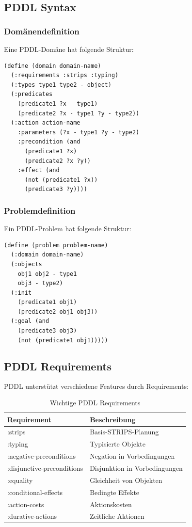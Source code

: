 ﻿\documentclass[a4paper,12pt]{article}
\theoremstyle{definition}
\begin{document}
\subsection{PDDL Syntax}

\subsubsection{Domänendefinition}

Eine PDDL-Domäne hat folgende Struktur:

\begin{lstlisting}[language=PDDL, caption=PDDL Domänen-Template]
(define (domain domain-name)
  (:requirements :strips :typing)
  (:types type1 type2 - object)
  (:predicates 
    (predicate1 ?x - type1)
    (predicate2 ?x - type1 ?y - type2))
  (:action action-name
    :parameters (?x - type1 ?y - type2)
    :precondition (and
      (predicate1 ?x)
      (predicate2 ?x ?y))
    :effect (and
      (not (predicate1 ?x))
      (predicate3 ?y))))
\end{lstlisting}

\subsubsection{Problemdefinition}

Ein PDDL-Problem hat folgende Struktur:

\begin{lstlisting}[language=PDDL, caption=PDDL Problem-Template]
(define (problem problem-name)
  (:domain domain-name)
  (:objects
    obj1 obj2 - type1
    obj3 - type2)
  (:init
    (predicate1 obj1)
    (predicate2 obj1 obj3))
  (:goal (and
    (predicate3 obj3)
    (not (predicate1 obj1)))))
\end{lstlisting}

\subsection{PDDL Requirements}

PDDL unterstützt verschiedene Features durch Requirements:

\begin{table}[h]
	\centering
	\caption{Wichtige PDDL Requirements}
	\label{tab:pddl_requirements}
	\begin{tabular}{ll}
		\toprule
		Requirement & Beschreibung \\
		\midrule
		:strips & Basis-STRIPS-Planung \\
		:typing & Typisierte Objekte \\
		:negative-preconditions & Negation in Vorbedingungen \\
		:disjunctive-preconditions & Disjunktion in Vorbedingungen \\
		:equality & Gleichheit von Objekten \\
		:conditional-effects & Bedingte Effekte \\
		:action-costs & Aktionskosten \\
		:durative-actions & Zeitliche Aktionen \\
		\bottomrule
	\end{tabular}
\end{table}
\end{document}
